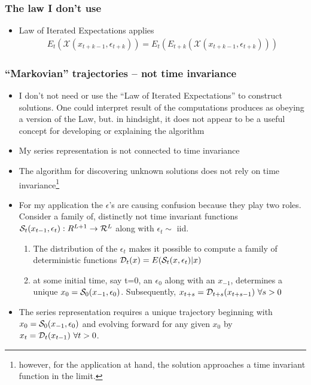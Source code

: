\documentclass[letter]{beamer}
\begin{document}
\begin{frame}
  \frametitle{The law I don't use}
   \begin{itemize}
 \item Law of Iterated Expectations applies
   \begin{gather*}
     E_t(\mathcal{X}(x_{t+k-1},\epsilon_{t+k}))=
     E_t(E_{t+k}(\mathcal{X}(x_{t+k-1},\epsilon_{t+k})))
   \end{gather*}
 \end{itemize}

\end{frame}


\begin{frame}
  \frametitle{``Markovian'' trajectories -- not time invariance}
  \begin{itemize}
  \item I don't not need or use the ``Law of Iterated Expectations'' to construct solutions.  One could interpret  result of the computations produces as obeying a version of the Law, but. in hindsight,
 it does not appear to be a useful concept for 
developing or explaining the algorithm
  \item My series representation is not connected to time invariance
  \item The algorithm for discovering unknown solutions does not rely on time invariance\footnote{ however, for the application at hand, the solution approaches a time invariant function  in the limit.}
  \item     For my application the $\epsilon$'s are causing 
confusion because they play two roles.
Consider a family of, distinctly not time invariant functions 
$\mathcal{S}_t(x_{t-1},\epsilon_t): {R}^{L+1} \rightarrow \mathcal{R}^L$ along with $\epsilon_t \sim $ iid.
    \begin{enumerate}
\item The distribution of the $\epsilon_t$ makes it possible to compute 
a family of deterministic functions $\mathcal{D}_t(x)=E( \mathcal{S}_t(x,\epsilon_t)|x) $
    \item at some initial time, say t=0, an $\epsilon_0$ 
along with an $x_{-1}$, determines a unique $x_0=\mathcal{S}_0(x_{-1},\epsilon_0)$.
Subsequently, $x_{t+s}=\mathcal{D}_{t+s}(x_{t+s-1})\,\, \forall s>0$
    \end{enumerate}
 \item The series representation requires a unique trajectory beginning with $x_0=\mathcal{S}_0(x_{-1},\epsilon_0)$ and 
evolving forward for any given $x_0$ by $x_t=\mathcal{D}_t(x_{t-1})\,\, \forall t>0$. 

  \end{itemize}
    
  \end{frame}
\end{document}
